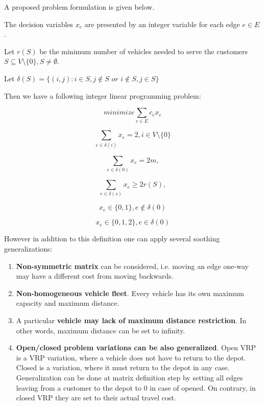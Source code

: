 \documentclass[11pt,a4paper,oneside]{book}
\begin{document}
A proposed problem formulation is given below.

The decision variables $x_e$ are presented by an integer variable for each edge $e \in E$.

Let $r(S)$ be the minimum number of vehicles needed to serve the customers $S \subseteq V\setminus\{0\}, S \neq \emptyset$.

Let $\delta(S)=\{(i,j):i \in S, j \notin \textit{S or i} \notin S, j \in S\}$

Then we have a following integer linear programming problem:

\begin{equation}
\label{eq:cvrp_obj}
minimize {\sum\limits_{e \in E} c_ex_e} 
\end{equation}

\begin{equation}
\label{eq:cvrp_constr1}
{\sum\limits_{e \in \delta(i)} x_e = 2}, i \in V\setminus\{0\}
\end{equation}

\begin{equation}
\label{eq:cvrp_constr2}
{\sum\limits_{e \in \delta(0)} x_e = 2m},
\end{equation}

\begin{equation}
\label{eq:cvrp_constr3}
{\sum\limits_{e \in \delta(s)} x_e \geq 2r(S)},
\end{equation}

\begin{equation}
\label{eq:cvrp_constr4}
x_e \in \{0,1\}, e \notin \delta(0)
\end{equation}

\begin{equation}
\label{eq:cvrp_constr5}
x_e \in \{0,1,2\}, e \in \delta(0)
\end{equation}


However in addition to this definition one can apply several soothing generalizations:

\begin{enumerate}
\item \textbf{Non-symmetric matrix} can be considered, i.e. moving an edge one-way may have a different cost from moving backwards.
\item \textbf{Non-homogeneous vehicle fleet}. Every vehicle has its own maximum capacity and maximum distance.
\item A particular \textbf{vehicle may lack of maximum distance restriction}. In other words, maximum distance can be set to infinity.
\item \textbf{Open/closed problem variations can be also generalized}. Open VRP is a VRP variation, where a vehicle does not have to return to the depot. Closed is a variation, where it must return to the depot in any case. Generalization can be done at matrix definition step by setting all edges leaving from a customer to the depot to 0 in case of opened. On contrary, in closed VRP they are set to their actual travel cost.
\end{enumerate}
\end{document}
